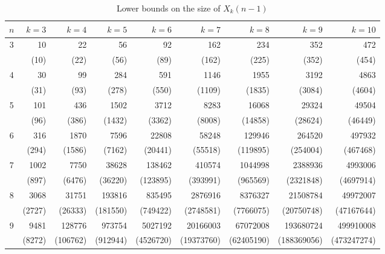 \documentclass[a4paper,11pt]{article}
\theoremstyle{plain}
\theoremstyle{definition}
\theoremstyle{remark}
\begin{document}
\begin{table}[htb]
\centering \caption{Lower bounds on the size of $X_k(n-1)$} \label{table:X_bound}
\begin{tiny}
\begin{tabular}{crrrrrrrr} \hline
$n$& $k=3$& $k=4$  & $k=5$   & $k=6$    & $k=7$    & $k=8$    & $k=9$     & $k=10$    \\ \hline
3  & 10   & 22     & 56      & 92       & 162      & 234      & 352       & 472       \\
   & (10) & (22)   & (56)    & (89)     & (162)    & (225)    & (352)     & (454)     \\ \hline
4  & 30   & 99     & 284     & 591      & 1146     & 1955     & 3192      & 4863      \\
   & (31) & (93)   & (278)   & (550)    & (1109)   & (1835)   & (3084)    & (4604)    \\ \hline
5  & 101  & 436    & 1502    & 3712     & 8283     & 16068    & 29324     & 49504     \\
   & (96) & (386)  & (1432)  & (3362)   & (8008)   & (14858)  & (28624)   & (46449)   \\ \hline
6  & 316  & 1870   & 7596    & 22808    & 58248    & 129946   & 264520    & 497932    \\
   & (294)& (1586) & (7162)  & (20441)  & (55518)  & (119895) & (254004)  & (467468)  \\ \hline
7  & 1002 & 7750   & 38628   & 138462   & 410574   & 1044998  & 2388936   & 4993006   \\
   & (897)& (6476) & (36220) & (123895) & (393991) & (965569) & (2321848) & (4697914) \\ \hline
8  & 3068 & 31751  & 193816  & 835495   & 2876916  & 8376327  & 21508784  & 49972007  \\
   &(2727)& (26333)& (181550)& (749422) & (2748581)& (7766075)& (20750748)& (47167644)\\ \hline
9  & 9481 & 128776 & 973754  & 5027192  & 20166003 & 67072008 & 193680724 & 499910008 \\
   &(8272)&(106762)& (912944)& (4526720)&(19373760)&(62405190)&(188369056)&(473247274)\\ \hline
\end{tabular}
\end{tiny}
\end{table}
\end{document}

